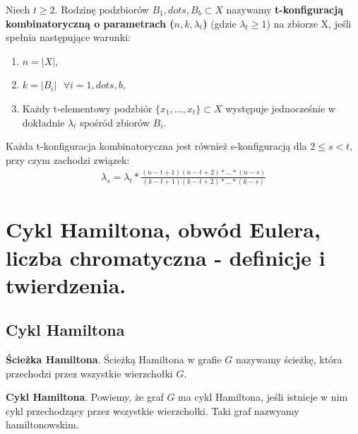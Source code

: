 \documentclass[12pt]{article}
\begin{document}
    \begin{definition}
        Niech $t \geq 2$. Rodzinę podzbiorów $B_1, dots, B_b \subset X$ nazywamy \textbf{t-konfiguracją kombinatoryczną
        o parametrach ($n, k, \lambda_t$)} (gdzie $\lambda_t \geq 1$) na zbiorze X, jeśli spełnia następujące warunki:
        \begin{enumerate}
            \item $n = |X|$,
            \item $k = |B_i| ~~~ \forall i = 1, dots, b$,
            \item Każdy t-elementowy podzbiór $\{x_1, \dots, x_t\} \subset X$ występuje jednocześnie w dokładnie
            $\lambda_t$ spośród zbiorów $B_i$.
        \end{enumerate}
    \end{definition}

    \begin{theorem}
        Każda t-konfiguracja kombinatoryczna jest również s-konfiguracją dla $2 \leq s < t$, przy czym zachodzi związek:
        \begin{align*}
            \lambda_s = \lambda_t * \frac{(n - t + 1)(n - t + 2) *\dots*(n - s)}{(k - t + 1)(k - t + 2) *\dots*(k - s)}
        \end{align*}
    \end{theorem}

    \newpage

    \section{Cykl Hamiltona, obwód Eulera, liczba chromatyczna - definicje i twierdzenia.}

    \subsection{Cykl Hamiltona}
    \begin{definition}
        \textbf{Ścieżka Hamiltona}. Ścieżką Hamiltona w grafie $G$ nazywamy ścieżkę, która przechodzi przez wszystkie
        wierzchołki $G$.
    \end{definition}

    \begin{definition}
        \textbf{Cykl Hamiltona}. Powiemy, że graf $G$ ma cykl Hamiltona, jeśli istnieje w nim cykl przechodzący przez
        wszystkie wierzchołki. Taki graf nazwyamy hamiltonowskim.
    \end{definition}
\end{document}
